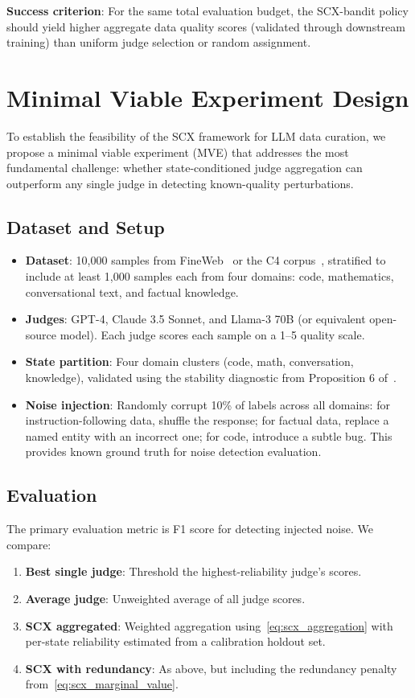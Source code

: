 \documentclass[11pt,twocolumn]{article}
\begin{document}
\textbf{Success criterion}: For the same total evaluation budget, the SCX-bandit policy should yield higher aggregate data quality scores (validated through downstream training) than uniform judge selection or random assignment.

\section{Minimal Viable Experiment Design}

To establish the feasibility of the SCX framework for LLM data curation, we propose a minimal viable experiment (MVE) that addresses the most fundamental challenge: whether state-conditioned judge aggregation can outperform any single judge in detecting known-quality perturbations.

\subsection{Dataset and Setup}

\begin{itemize}
    \item \textbf{Dataset}: 10,000 samples from FineWeb~\cite{penedo2023refinedweb} or the C4 corpus~\cite{raffel2020}, stratified to include at least 1,000 samples each from four domains: code, mathematics, conversational text, and factual knowledge.
    \item \textbf{Judges}: GPT-4, Claude 3.5 Sonnet, and Llama-3 70B (or equivalent open-source model). Each judge scores each sample on a 1--5 quality scale.
    \item \textbf{State partition}: Four domain clusters (code, math, conversation, knowledge), validated using the stability diagnostic from Proposition 6 of~\cite{scx2026}.
    \item \textbf{Noise injection}: Randomly corrupt 10\% of labels across all domains: for instruction-following data, shuffle the response; for factual data, replace a named entity with an incorrect one; for code, introduce a subtle bug. This provides known ground truth for noise detection evaluation.
\end{itemize}

\subsection{Evaluation}

The primary evaluation metric is F1 score for detecting injected noise. We compare:
\begin{enumerate}
    \item \textbf{Best single judge}: Threshold the highest-reliability judge's scores.
    \item \textbf{Average judge}: Unweighted average of all judge scores.
    \item \textbf{SCX aggregated}: Weighted aggregation using~\eqref{eq:scx_aggregation} with per-state reliability estimated from a calibration holdout set.
    \item \textbf{SCX with redundancy}: As above, but including the redundancy penalty from~\eqref{eq:scx_marginal_value}.
\end{enumerate}
\end{document}
